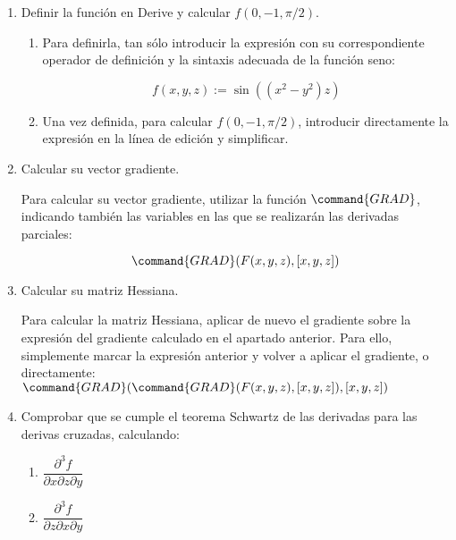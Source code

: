 \begin{enumerate}[leftmargin=*]
\begin{enumerate}
\item Definir la función en Derive y calcular $f(0,-1,\pi/2)$.


\begin{indication}
{
\begin{enumerate}

\item Para definirla, tan sólo introducir la expresión con su
correspondiente operador de definición y la sintaxis adecuada de la
función seno:

\[
f(x,y,z):=\sin((x^2-y^2)z)
\]

\item Una vez definida, para calcular $f(0,-1,\pi/2)$, introducir
directamente la expresión en la línea de edición y simplificar.

\end{enumerate}
}
\end{indication}

\item Calcular su vector gradiente.

\begin{indication}
{Para calcular su vector gradiente, utilizar la función
$\command{GRAD}$, indicando también las variables en las que se
realizarán las derivadas parciales:

\[
\command{GRAD}(F(x,y,z), [x,y,z])
\]

}
\end{indication}

\item Calcular su matriz Hessiana.

\begin{indication}
{Para calcular la matriz Hessiana, aplicar de nuevo el gradiente
sobre la expresión del gradiente calculado en el apartado anterior.
Para ello, simplemente marcar la expresión anterior y volver a
aplicar el gradiente, o directamente:
$\command{GRAD}(\command{GRAD}(F(x,y,z),[x,y,z]),[x,y,z])$

}
\end{indication}

\item Comprobar que se cumple el teorema Schwartz de las derivadas
para las derivas cruzadas, calculando:

\begin{enumerate}

\item $\dfrac{{\partial ^3 f}} {{\partial x\partial z\partial y}}$

\item $\dfrac{{\partial ^3 f}} {{\partial z\partial x\partial y}}$


\end{enumerate}
\end{enumerate}
\end{enumerate}

